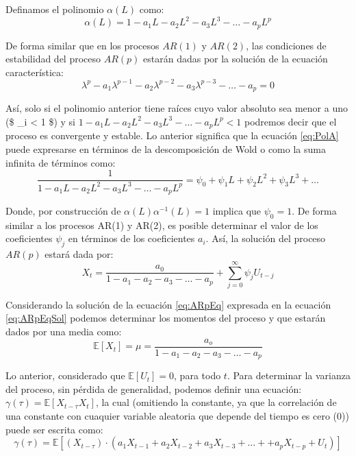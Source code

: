 \documentclass[
]{book}
\begin{document}
Definamos el polinomio \(\alpha(L)\) como:
\begin{equation}
    \alpha(L) = 1 - a_1 L - a_2 L^2 - a_3 L^3 - \ldots - a_p L^p
    \label{eq:PolA}
\end{equation}

De forma similar que en los procesos \(AR(1)\) y \(AR(2)\), las condiciones de estabilidad del proceso \(AR(p)\) estarán dadas por la solución de la ecuación característica:
\begin{equation}
    \lambda^p - a_1 \lambda^{p-1} - a_2 \lambda^{p-2} - a_3 \lambda^{p-3} - \ldots - a_p = 0
\end{equation}

Así, solo si el polinomio anterior tiene raíces cuyo valor absoluto sea menor a uno (\$ \textbar{} \lambda\_i \textbar{} \textless{} 1 \$) y si \(1 - a_1 L - a_2 L^2 - a_3 L^3 - \ldots - a_p L^p < 1\) podremos decir que el proceso es convergente y estable. Lo anterior significa que la ecuación \eqref{eq:PolA} puede expresarse en términos de la descomposición de Wold o como la suma infinita de términos como:
\begin{equation}
    \frac{1}{1 - a_1 L  - a_2 L^2 - a_3 L^3  - \ldots - a_p L^p} = \psi_0 + \psi_1 L + \psi_2 L^2 + \psi_3 L^3 + \ldots
\end{equation}

Donde, por construcción de \(\alpha(L) \alpha^{-1}(L) = 1\) implica que \(\psi_0 = 1\). De forma similar a los procesos AR(1) y AR(2), es posible determinar el valor de los coeficientes \(\psi_j\) en términos de los coeficientes \(a_i\). Así, la solución del proceso \(AR(p)\) estará dada por:
\begin{equation}
    X_t = \frac{a_0}{1 - a_1  - a_2 - a_3  - \ldots - a_p} + \sum^{\infty}_{j = 0} \psi_j U_{t-j}
    \label{eq:ARpEqSol}
\end{equation}

Considerando la solución de la ecuación \eqref{eq:ARpEq} expresada en la ecuación \eqref{eq:ARpEqSol} podemos determinar los momentos del proceso y que estarán dados por una media como:
\begin{equation}
    \mathbb{E}[X_t] = \mu = \frac{a_o}{1 - a_1  - a_2 - a_3  - \ldots - a_p}
\end{equation}

Lo anterior, considerado que \(\mathbb{E}[U_t] = 0\), para todo \(t\). Para determinar la varianza del proceso, sin pérdida de generalidad, podemos definir una ecuación: \(\gamma(\tau) = \mathbb{E}[X_{t - \tau} X_t]\), la cual (omitiendo la constante, ya que la correlación de una constante con cuaquier variable aleatoria que depende del tiempo es cero (0)) puede ser escrita como:
\begin{equation}
    \gamma(\tau) = \mathbb{E}[(X_{t - \tau}) \cdot (a_1 X_{t-1} + a_2 X_{t-2} + a_3 X_{t-3} + \ldots + + a_p X_{t-p} + U_t)]
\end{equation}
\end{document}
